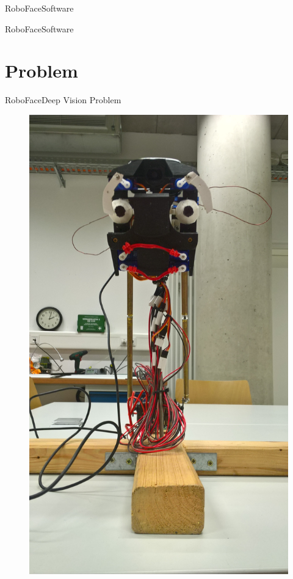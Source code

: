 \documentclass{beamer}
\begin{document}
\begin{frame}{RoboFace}{Software}
    \lstServoConstraints
\end{frame}

\begin{frame}{RoboFace}{Software}
    \lstFaceBackend
\end{frame}

\section{Problem}
\begin{frame}{RoboFace}{Deep Vision Problem}
	\begin{figure}
		\centering
		\vspace*{-18mm}
		\includegraphics[width=0.8\linewidth,angle=270]{figures/roboFace}
		\label{fig:face}
	\end{figure}
\end{frame}
\end{document}
